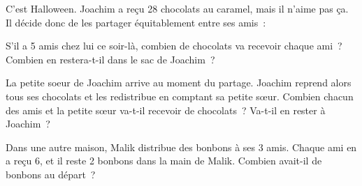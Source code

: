 %
%
C'est Halloween. Joachim a reçu 28 chocolats au caramel, mais il n'aime pas ça. Il décide donc de les partager équitablement entre ses amis~:
    \begin{tasks}
        \task S'il a 5 amis chez lui ce soir-là, combien de chocolats va recevoir chaque ami~? \\
        Combien en restera-t-il dans le sac de Joachim~?

        \task La petite soeur de Joachim arrive au moment du partage. Joachim reprend alors tous ses chocolats et les redistribue en comptant sa petite sœur. Combien chacun des amis et la petite sœur va-t-il recevoir de chocolats~? Va-t-il en rester à Joachim~?

        \task Dans une autre maison, Malik distribue des bonbons à ses 3 amis. Chaque ami en a reçu 6, et il reste 2 bonbons dans la main de Malik. Combien avait-il de bonbons au départ~?

    \end{tasks}

